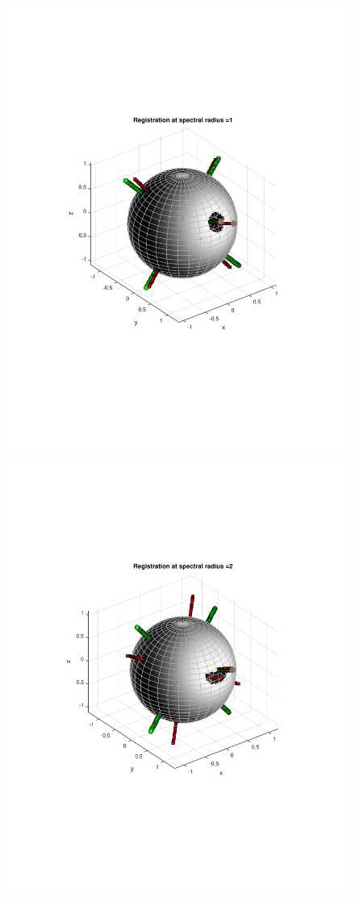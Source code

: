 \documentclass{UCF_ETD}
\begin{document}
\begin{figure}[H]
\begin{center}
\includegraphics[scale=0.38]{RobustRegistration/NoisyVolumeTransReg_1}
\includegraphics[scale=0.38]{RobustRegistration/NoisyVolumeTransReg_2}

\end{center}
\end{figure}
\end{document}
